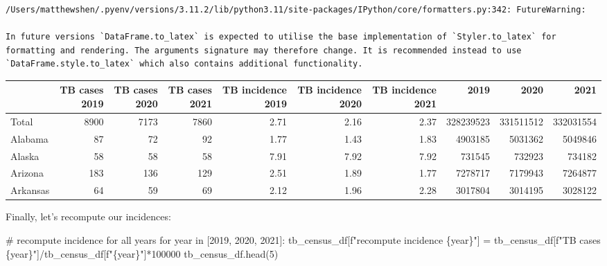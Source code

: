 \documentclass[
  letterpaper,
  DIV=11,
  numbers=noendperiod]{scrreprt}
\newenvironment{Shaded}{\begin{snugshade}}{\end{snugshade}}
\newcommand{\CommentTok}[1]{\textcolor[rgb]{0.37,0.37,0.37}{#1}}
\newcommand{\ControlFlowTok}[1]{\textcolor[rgb]{0.00,0.23,0.31}{#1}}
\newcommand{\DecValTok}[1]{\textcolor[rgb]{0.68,0.00,0.00}{#1}}
\newcommand{\KeywordTok}[1]{\textcolor[rgb]{0.00,0.23,0.31}{#1}}
\newcommand{\NormalTok}[1]{\textcolor[rgb]{0.00,0.23,0.31}{#1}}
\newcommand{\OperatorTok}[1]{\textcolor[rgb]{0.37,0.37,0.37}{#1}}
\newcommand{\SpecialCharTok}[1]{\textcolor[rgb]{0.37,0.37,0.37}{#1}}
\newcommand{\SpecialStringTok}[1]{\textcolor[rgb]{0.13,0.47,0.30}{#1}}
\begin{document}
\begin{verbatim}
/Users/matthewshen/.pyenv/versions/3.11.2/lib/python3.11/site-packages/IPython/core/formatters.py:342: FutureWarning:

In future versions `DataFrame.to_latex` is expected to utilise the base implementation of `Styler.to_latex` for formatting and rendering. The arguments signature may therefore change. It is recommended instead to use `DataFrame.style.to_latex` which also contains additional functionality.
\end{verbatim}

\begin{tabular}{lrrrrrrrrr}
\toprule
{} &  TB cases 2019 &  TB cases 2020 &  TB cases 2021 &  TB incidence 2019 &  TB incidence 2020 &  TB incidence 2021 &       2019 &       2020 &       2021 \\
\midrule
Total    &           8900 &           7173 &           7860 &               2.71 &               2.16 &               2.37 &  328239523 &  331511512 &  332031554 \\
Alabama  &             87 &             72 &             92 &               1.77 &               1.43 &               1.83 &    4903185 &    5031362 &    5049846 \\
Alaska   &             58 &             58 &             58 &               7.91 &               7.92 &               7.92 &     731545 &     732923 &     734182 \\
Arizona  &            183 &            136 &            129 &               2.51 &               1.89 &               1.77 &    7278717 &    7179943 &    7264877 \\
Arkansas &             64 &             59 &             69 &               2.12 &               1.96 &               2.28 &    3017804 &    3014195 &    3028122 \\
\bottomrule
\end{tabular}

Finally, let's recompute our incidences:

\begin{Shaded}
\begin{Highlighting}[]
\CommentTok{\# recompute incidence for all years}
\ControlFlowTok{for}\NormalTok{ year }\KeywordTok{in}\NormalTok{ [}\DecValTok{2019}\NormalTok{, }\DecValTok{2020}\NormalTok{, }\DecValTok{2021}\NormalTok{]:}
\NormalTok{    tb\_census\_df[}\SpecialStringTok{f"recompute incidence }\SpecialCharTok{\{}\NormalTok{year}\SpecialCharTok{\}}\SpecialStringTok{"}\NormalTok{] }\OperatorTok{=}\NormalTok{ tb\_census\_df[}\SpecialStringTok{f"TB cases }\SpecialCharTok{\{}\NormalTok{year}\SpecialCharTok{\}}\SpecialStringTok{"}\NormalTok{]}\OperatorTok{/}\NormalTok{tb\_census\_df[}\SpecialStringTok{f"}\SpecialCharTok{\{}\NormalTok{year}\SpecialCharTok{\}}\SpecialStringTok{"}\NormalTok{]}\OperatorTok{*}\DecValTok{100000}
\NormalTok{tb\_census\_df.head(}\DecValTok{5}\NormalTok{)}
\end{Highlighting}
\end{Shaded}
\end{document}
